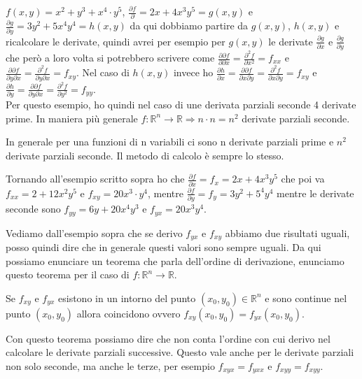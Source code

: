 \begin{example}
$f(x,y) = x^2 + y^3 + x^4 \cdot y^5$, $\frac{\partial f}{\partial } = 2x + 4x^3 y^5 = g(x,y)$ e $\frac{\partial g}{\partial y} = 3y^2 + 5x^4 y^4 = h(x,y)$ da qui dobbiamo partire da $g(x,y)$, $h(x,y)$ e ricalcolare le derivate, quindi avrei per esempio per $g(x,y)$ le derivate $\frac{\partial g}{\partial x}$ e $\frac{\partial g}{\partial y}$ che però a loro volta si potrebbero scrivere come $\frac{\partial \partial f}{\partial \partial x} = \frac{\partial^2 f}{\partial x^2} = f_{xx}$ e $\frac{\partial \partial f}{\partial y \partial x} = \frac{\partial^2 f}{\partial y \partial x} = f_{xy}$. Nel caso di $h(x,y)$ invece ho $\frac{\partial h}{\partial x} = \frac{\partial \partial f}{\partial x \partial y} = \frac{\partial^2 f}{\partial x \partial y} = f_{xy}$ e $\frac{\partial h}{\partial y} = \frac{\partial \partial f}{\partial y \partial x} = \frac{\partial^2 f}{\partial y^2} = f_{yy}$.\\
Per questo esempio, ho quindi nel caso di une derivata parziali seconde 4 derivate prime. In maniera più generale $f: \mathbb{R}^n \to \mathbb{R} \Longrightarrow n \cdot n = n^2$ derivate parziali seconde.
\end{example}

\begin{observation}
In generale per una funzioni di n variabili ci sono n derivate parziali prime e $n^2$ derivate parziali seconde. Il metodo di calcolo è sempre lo stesso.
\end{observation}

\begin{example}
Tornando all'esempio scritto sopra ho che $\frac{\partial f}{\partial x} = f_x = 2x + 4x^3 y^5$ che poi va $f_{xx} = 2 + 12x^2y^5$ e $f_{xy} = 20x^3 \cdot y^4$, mentre $\frac{\partial f}{\partial y} = f_y = 3y^2 + 5^4 y^4$ mentre le derivate seconde sono $f_{yy} = 6y + 20x^4y^3$ e $f_{yx} = 20x^3y^4$.
\end{example}

\hspace{-15pt}Vediamo dall'esempio sopra che se derivo $f_{yx}$ e $f_{xy}$ abbiamo due risultati uguali, posso quindi dire che in generale questi valori sono sempre uguali. Da qui possiamo enunciare un teorema che parla dell'ordine di derivazione, enunciamo questo teorema per il caso di $f: \mathbb{R}^n \to \mathbb{R}$.

\begin{theorem}
Se $f_{xy}$ e $f_{yx}$ esistono in un intorno del punto $(x_0, y_0) \in \mathbb{R}^n$ e sono continue nel punto $(x_0,y_0)$ allora coincidono ovvero $f_{xy}(x_0,y_0) = f_{yx}(x_0,y_0)$.
\end{theorem}
\hspace{-15pt}Con questo teorema possiamo dire che non conta l'ordine con cui derivo nel calcolare le derivate parziali successive. Questo vale anche per le derivate parziali non solo seconde, ma anche le terze, per esempio $f_{xyx} = f_{yxx}$ e $f_{xyy} = f_{xyy}$.

